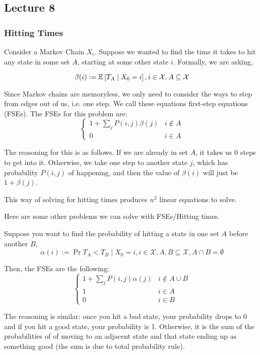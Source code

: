 \subsection{Lecture 8}

\subsubsection{Hitting Times}

\begin{note}
Consider a Markov Chain $X_i$. Suppose we wanted to find
the time it takes to hit any state in some set $A$, starting at some other state $i$.
Formally, we are asking,

\[ \beta(i) := \mathbb{E}\left[ T_A \mid X_0 = i \right], i \in \mathcal{X}, A \subseteq \mathcal{X} \]

Since Markov chains are memoryless, we only need to consider the ways to step from
edges out of us, i.e. one step. We call these equations first-step equations (FSEs).
The FSEs for this problem are:
\[
\begin{cases}
    1 + \sum_j P(i, j) \beta(j) & i \notin A \\
    0 & i \in A
\end{cases}
\]

The reasoning for this is as follows. If we are already in set $A$,
it takes us 0 steps to get into it. Otherwise, we take one step to another state $j$,
which has probability $P(i, j)$ of happening, and then the value of $\beta(i)$ will just be $1 + \beta(j)$.
\end{note}

This way of solving for hitting times produces $n^2$ linear equations to solve.

Here are some other problems we can solve with FSEs/Hitting times.

\begin{note}
Suppose you want to find the probability of hitting a state in one set $A$ before another $B$,
\[ \alpha(i) := \Pr{T_A < T_B \mid X_0 = i}, i \in \mathcal{X}, A,B \subseteq \mathcal{X}, A \cap B = \emptyset \]

Then, the FSEs are the following:
\[ 
    \begin{cases}
        1+\sum_j P(i, j) \alpha(j) & i \notin A \cup B \\
        1 & i \in A \\
        0 & i \in B
    \end{cases}
\]

The reasoning is similar: once you hit a bad state, your probability drops to 0 and
if you hit a good state, your probability is 1. Otherwise, it is the sum of the probabilities of
of moving to an adjacent state and that state ending up as something good (the sum is due to total probability rule).
\end{note}

